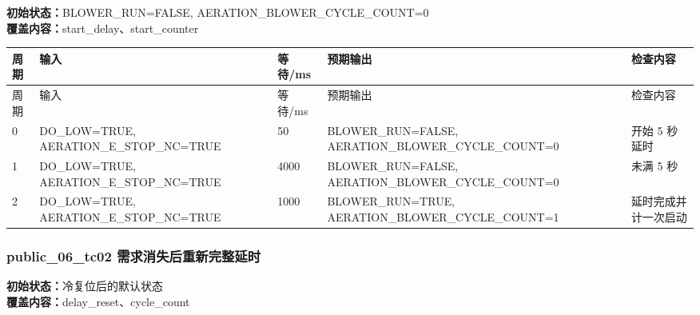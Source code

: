 \noindent\textbf{初始状态：}BLOWER\_RUN=FALSE, AERATION\_BLOWER\_CYCLE\_COUNT=0\\

\textbf{覆盖内容：}start\_delay、start\_counter

\begin{longtable}{L{1.0cm}L{4.7cm}L{1.4cm}L{4.0cm}L{2.1cm}}

\toprule

周期 & 输入 & 等待/ms & 预期输出 & 检查内容\\

\midrule

\endfirsthead

\toprule

周期 & 输入 & 等待/ms & 预期输出 & 检查内容\\

\midrule

\endhead

0 & DO\_LOW=TRUE, AERATION\_E\_STOP\_NC=TRUE & 50 & BLOWER\_RUN=FALSE, AERATION\_BLOWER\_CYCLE\_COUNT=0 & 开始 5 秒延时\\

1 & DO\_LOW=TRUE, AERATION\_E\_STOP\_NC=TRUE & 4000 & BLOWER\_RUN=FALSE, AERATION\_BLOWER\_CYCLE\_COUNT=0 & 未满 5 秒\\

2 & DO\_LOW=TRUE, AERATION\_E\_STOP\_NC=TRUE & 1000 & BLOWER\_RUN=TRUE, AERATION\_BLOWER\_CYCLE\_COUNT=1 & 延时完成并计一次启动\\

\bottomrule

\end{longtable}

\subsubsection{{\ttfamily public\_06\_tc02} 需求消失后重新完整延时}

\noindent\textbf{初始状态：}冷复位后的默认状态\\

\textbf{覆盖内容：}delay\_reset、cycle\_count

